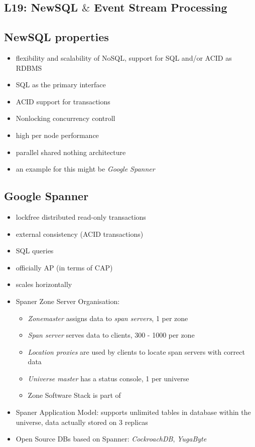 \documentclass[a4paper]{article}
\begin{document}
\begin{multicols}{3}
\section{L19: NewSQL $\&$ Event Stream Processing}

\subsection{NewSQL properties}
\begin{itemize}
    \item flexibility and scalability of NoSQL, support for SQL and/or ACID as RDBMS
    \item SQL as the primary interface
    \item ACID support for transactions
    \item Nonlocking concurrency controll
    \item high per node performance 
    \item parallel shared nothing architecture
    \item an example for this might be \textit{Google Spanner}
\end{itemize}

\subsection{Google Spanner}
\begin{itemize}
    \item lockfree distributed read-only transactions
    \item external consistency (ACID transactions)
    \item SQL queries
    \item officially AP (in terms of CAP)
    \item scales horizontally
    \item Spaner Zone Server Organisation:
        \begin{itemize}
            \item \textit{Zonemaster} assigns data to \textit{span servers}, 1 per zone
            \item \textit{Span server} serves data to clients, 300 - 1000 per zone
            \item \textit{Location proxies} are used by clients to locate span servers with correct data
            \item \textit{Universe master} has a status console, 1 per universe
            \item Zone Software Stack is part of 
        \end{itemize}
    \item Spaner Application Model: supports unlimited tables in database within the universe, data actually stored on 3 replicas
    \item Open Source DBs based on Spanner: \textit{CockroachDB}, \textit{YugaByte}
\end{itemize}


\end{multicols}
\end{document}

